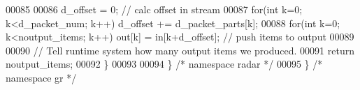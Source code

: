 \begin{DoxyCode}
00085 
00086         d_offset = 0; \textcolor{comment}{// calc offset in stream}
00087             \textcolor{keywordflow}{for}(\textcolor{keywordtype}{int} k=0; k<d_packet_num; k++) d_offset += d_packet_parts[k];
00088             \textcolor{keywordflow}{for}(\textcolor{keywordtype}{int} k=0; k<noutput\_items; k++) out[k] = in[k+d_offset]; \textcolor{comment}{// push items to output}
00089 
00090         \textcolor{comment}{// Tell runtime system how many output items we produced.}
00091         \textcolor{keywordflow}{return} noutput\_items;
00092     \}
00093 
00094   \} \textcolor{comment}{/* namespace radar */}
00095 \} \textcolor{comment}{/* namespace gr */}
\end{DoxyCode}
